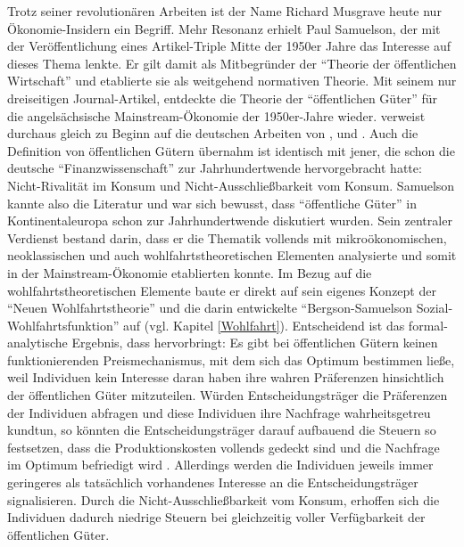 Trotz seiner revolutionären Arbeiten ist der Name Richard Musgrave heute nur Ökonomie-Insidern ein Begriff. Mehr Resonanz erhielt Paul Samuelson, der mit der Veröffentlichung eines Artikel-Triple \parencite{Samuelson1954, Samuelson1955, Samuelson1958} Mitte der 1950er Jahre das Interesse auf dieses Thema lenkte. Er gilt damit als Mitbegründer der "`Theorie der öffentlichen Wirtschaft"' und etablierte sie als weitgehend normativen Theorie. Mit seinem nur dreiseitigen Journal-Artikel, entdeckte \textcite{Samuelson1954} die Theorie der "`öffentlichen Güter"' für die angelsächsische Mainstream-Ökonomie der 1950er-Jahre wieder.  \textcite[S. 387]{Samuelson1954} verweist durchaus gleich zu Beginn auf die deutschen Arbeiten von \textcite{Sax1887}, \textcite{Lindhal1928} und \textcite{Wicksell1896}. Auch die Definition von öffentlichen Gütern übernahm ist identisch mit jener, die schon die deutsche "`Finanzwissenschaft"' zur Jahrhundertwende hervorgebracht hatte: Nicht-Rivalität im Konsum  und Nicht-Ausschließbarkeit vom Konsum. Samuelson kannte also die Literatur und war sich bewusst, dass "`öffentliche Güter"' in Kontinentaleuropa schon zur Jahrhundertwende diskutiert wurden. Sein zentraler Verdienst bestand darin, dass er die Thematik vollends mit mikroökonomischen, neoklassischen und auch wohlfahrtstheoretischen Elementen analysierte und somit in der Mainstream-Ökonomie etablierten konnte. Im Bezug auf die wohlfahrtstheoretischen Elemente baute er direkt auf sein eigenes Konzept der "`Neuen Wohlfahrtstheorie"' und die darin entwickelte "`Bergson-Samuelson Sozial-Wohlfahrtsfunktion"' auf (vgl. Kapitel \ref{Wohlfahrt}). Entscheidend ist das formal-analytische Ergebnis, dass \textcite{Samuelson1954} hervorbringt: Es gibt bei öffentlichen Gütern keinen funktionierenden Preismechanismus, mit dem sich das Optimum bestimmen ließe, weil Individuen kein Interesse daran haben ihre wahren Präferenzen hinsichtlich der öffentlichen Güter mitzuteilen. Würden Entscheidungsträger die Präferenzen der Individuen abfragen und diese Individuen ihre Nachfrage wahrheitsgetreu kundtun, so könnten die Entscheidungsträger darauf aufbauend die Steuern so festsetzen, dass die Produktionskosten vollends gedeckt sind und die Nachfrage im Optimum befriedigt wird \parencite[S. 389]{Samuelson1954}. Allerdings werden die Individuen jeweils immer geringeres als tatsächlich vorhandenes Interesse an die Entscheidungsträger signalisieren. Durch die Nicht-Ausschließbarkeit vom Konsum, erhoffen sich die Individuen dadurch niedrige Steuern bei gleichzeitig voller Verfügbarkeit der öffentlichen Güter.


